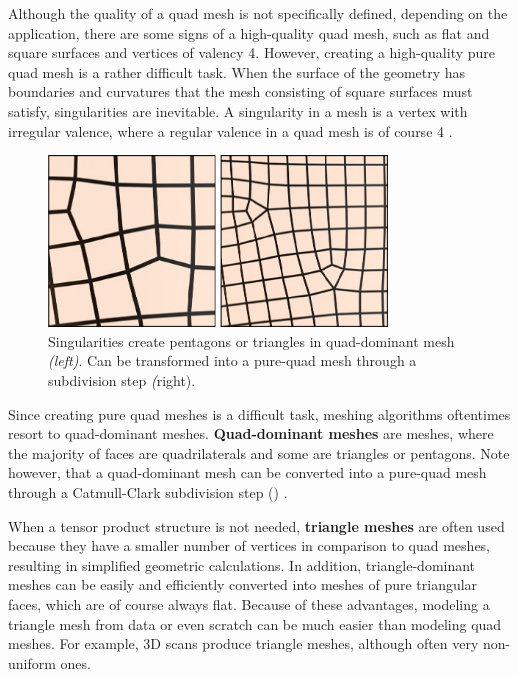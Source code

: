 \documentclass{ACGSeminar}
\begin{document}
Although the quality of a quad mesh is not specifically defined, depending on the application, there are some signs of a high-quality quad mesh, such as flat and square surfaces and vertices of valency 4. However, creating a high-quality pure quad mesh is a rather difficult task. When the surface of the geometry has boundaries and curvatures that the mesh consisting of square surfaces must satisfy, singularities are inevitable. A singularity in a mesh is a vertex with irregular valence, where a regular valence in a quad mesh is of course 4 \cite{fogg2017simple,fogg2018singularities}.

\begin{figure}[htb!]
	\begin{centering}
		\includegraphics[width=9cm]{img/Singularities.png}\par
	\end{centering}
	\caption{Singularities create pentagons or triangles in quad-dominant mesh \textit{(left)}. Can be transformed into a pure-quad mesh through a subdivision step \textit(right). \cite{jakob2015instant}}
	\label{fig:singularities}
\end{figure}

Since creating pure quad meshes is a difficult task, meshing algorithms oftentimes resort to quad-dominant meshes. \textbf{Quad-dominant meshes} are meshes, where the majority of faces are quadrilaterals and some are triangles or pentagons. Note however, that a quad-dominant mesh can be converted into a pure-quad mesh through a Catmull-Clark subdivision step (\cite{catmull1978recursively}) \cite{jakob2015instant}.\bigskip

When a tensor product structure is not needed, \textbf{triangle meshes} are often used because they have a smaller number of vertices in comparison to quad meshes, resulting in simplified geometric calculations. In addition, triangle-dominant meshes can be easily and efficiently converted into meshes of pure triangular faces, which are of course always flat. Because of these advantages, modeling a triangle mesh from data or even scratch can be much easier than modeling quad meshes. For example, 3D scans produce triangle meshes, although often very non-uniform ones.\bigskip
\end{document}
